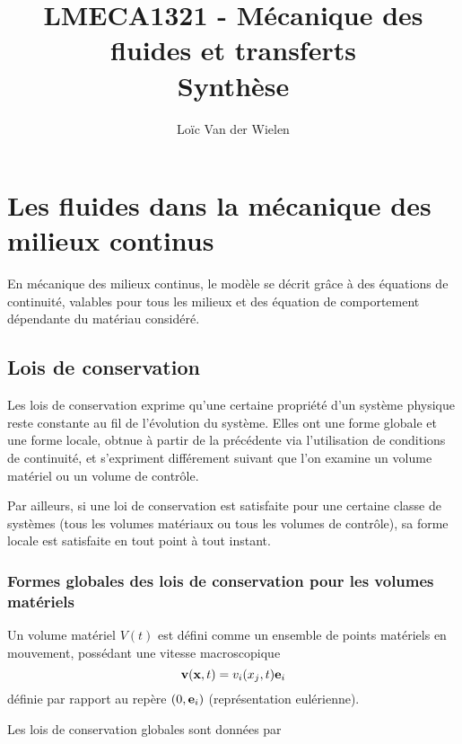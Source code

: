 \documentclass[a4paper,11pt]{report}
\title{LMECA1321 - Mécanique des fluides et transferts\\Synthèse}
\author{Loïc Van der Wielen}
\begin{document}
\maketitle
\tableofcontents

\chapter{Les fluides dans la mécanique des milieux continus}
  En mécanique des milieux continus, le modèle se décrit grâce à des équations de continuité, valables pour tous les milieux et des équation de comportement dépendante du matériau considéré.

  \section{Lois de conservation}
    Les lois de conservation exprime qu'une certaine propriété d'un système physique reste constante au fil de l'évolution du système. Elles ont une forme globale et une forme locale, obtnue à partir de la précédente via l'utilisation de conditions de continuité, et s'expriment différement suivant que l'on examine un volume matériel ou un volume de contrôle.

    Par ailleurs, si une loi de conservation est satisfaite pour une certaine classe de systèmes (tous les volumes matériaux ou tous les volumes de contrôle), sa forme locale est satisfaite en tout point à tout instant.

    \subsection{Formes globales des lois de conservation pour les volumes matériels}
      Un volume matériel $V(t)$ est défini comme un ensemble de points matériels en mouvement, possédant une vitesse macroscopique
      \begin{equation}
        \vb{v}(\vb{x}, t) = v_i(x_j, t)\vb{e}_i
      \end{equation}
      définie par rapport au repère $(0, \vb{e}_i)$ (représentation eulérienne).

      Les lois de conservation globales sont données par
\end{document}
